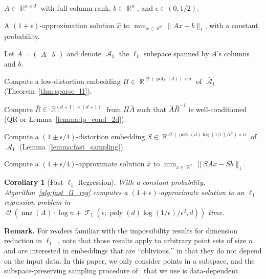 \documentclass[11pt]{article}
\newtheorem{corollary}{Corollary}
\DeclareMathOperator{\poly}{poly}
\DeclareMathOperator{\bigO}{\mathcal{O}}
\DeclareMathOperator{\nnz}{nnz}
\DeclareMathOperator{\A}{\mathcal{A}}
\DeclareMathOperator{\R}{\mathbb{R}}
\DeclareMathOperator{\T}{\mathcal{T}}
\begin{document}
\begin{algorithm}
  \caption{Fast $\ell_1$ Regression Approximation in $\bigO(\nnz(A) \cdot \log n
    + \poly(d) \log(1/\epsilon)/\epsilon^2)$ Time}
  \label{alg:fast_l1_reg}
  \begin{algorithmic}[1]
    \Require $A \in \R^{n \times d}$ with full column rank, $b \in \R^n$, and
    $\epsilon \in (0, 1/2)$.  

    \Ensure A $(1+\epsilon)$-approximation solution $\hat{x}$ to $\min_{x \in
      \R^d} \|A x - b\|_1$, with a constant probability.

    \State Let $\bar{A} =
    \begin{pmatrix}
      A & b
    \end{pmatrix}$ and denote $\bar{\A}_1$ the $\ell_1$ subspace spanned by
    $A$'s columns and $b$.
    
    \State Compute a low-distortion embedding $\Pi \in \R^{\bigO(\poly(d))
      \times n}$ of $\bar{\A}_1$ (Theorem~\ref{thm:sparse_l1}).
    
    \State Compute $\bar{R} \in \R^{(d+1) \times (d+1)}$ from $\Pi \bar{A}$ such
    that $\bar{A} \bar{R}^{-1}$ is well-conditioned (QR or
    Lemma~\ref{lemma:lp_cond_2d}).

    \State Compute a $(1 \pm \epsilon/4)$-distortion embedding $S \in
    \R^{\bigO(\poly(d) \log(1/\epsilon)/\epsilon^2) \times n}$ of $\bar{\A}_1$
    (Lemma~\ref{lemma:fast_sampling}).

    \State Compute a $(1+\epsilon/4)$-approximate solution $\hat{x}$ to $\min_{x
      \in \R^d} \|S A x - S b\|_1$.
  \end{algorithmic}
\end{algorithm}

\begin{corollary}[Fast $\ell_1$ Regression]
  \label{cor:l1reg}
  With a constant probability, Algorithm~\ref{alg:fast_l1_reg} computes a
  $(1+\epsilon)$-approximate solution to an $\ell_1$ regression problem in
  $\bigO(\nnz(A) \cdot \log n + \T_1(\epsilon; \poly(d) \log(1/\epsilon) /
  \epsilon^2, d))$ time.
\end{corollary}

\noindent
\textbf{Remark.}
For readers familiar with the impossibility results for dimension reduction in
$\ell_1$~\cite{CS02,LN04,BC05}, note that those results apply to arbitrary point
sets of size $n$ and are interested in embeddings that are ``oblivious,'' in
that they do not depend on the input data.
In this paper, we only consider points in a subspace, and the
subspace-preserving sampling procedure of~\cite{DDHKM09_lp_SICOMP} that we use
is data-dependent.  
\end{document}
